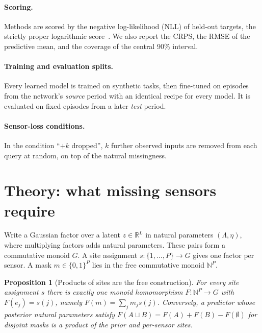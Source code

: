\documentclass{article}
\newtheorem{proposition}{Proposition}
\newcommand{\R}{\mathbb{R}}
\begin{document}
\paragraph{Scoring.} Methods are scored by the negative log-likelihood (NLL) of held-out targets, the strictly proper
logarithmic score~\citep{gneiting2007scoring}. We also report the CRPS, the RMSE of the predictive mean, and the
coverage of the central 90\% interval.

\paragraph{Training and evaluation splits.} Every learned model is trained on synthetic tasks, then fine-tuned on episodes
from the network's \emph{source} period with an identical recipe for every model. It is evaluated on fixed episodes
from a later \emph{test} period.

\paragraph{Sensor-loss conditions.} In the condition ``$+k$ dropped'', $k$ further observed inputs are removed from each query
at random, on top of the natural missingness.

\section{Theory: what missing sensors require}
\label{sec:theory}

Write a Gaussian factor over a latent $z\in\R^{L}$ in natural parameters $(\Lambda,\eta)$, where multiplying factors
adds natural parameters. These pairs form a commutative monoid $G$. A site assignment $s:\{1,\dots,P\}\to G$ gives one
factor per sensor. A mask $m\in\{0,1\}^P$ lies in the free commutative monoid $\mathbb{N}^P$.

\begin{proposition}[Products of sites are the free construction]\label{prop:free}
For every site assignment $s$ there is exactly one monoid homomorphism $F:\mathbb{N}^P\to G$ with $F(e_j)=s(j)$,
namely $F(m)=\sum_j m_j s(j)$. Conversely, a predictor whose posterior natural parameters satisfy
$F(A\sqcup B)=F(A)+F(B)-F(\emptyset)$ for disjoint masks is a product of the prior and per-sensor sites.
\end{proposition}
\end{document}
